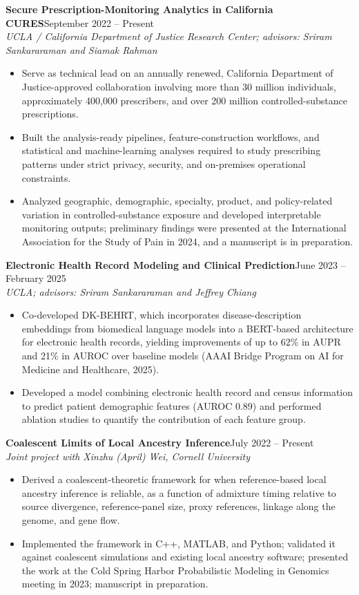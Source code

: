 \documentclass[10pt,letterpaper]{article}
\newcommand{\entry}[4]{\noindent\textbf{#1}\hfill #2\\ {\itshape #3}\hfill #4\par}
\begin{document}
\entry{Secure Prescription-Monitoring Analytics in California CURES}{September 2022 -- Present}{UCLA / California Department of Justice Research Center; advisors: Sriram Sankararaman and Siamak Rahman}{}
\begin{itemize}
\item Serve as technical lead on an annually renewed, California Department of Justice-approved collaboration involving more than 30 million individuals, approximately 400,000 prescribers, and over 200 million controlled-substance prescriptions.
\item Built the analysis-ready pipelines, feature-construction workflows, and statistical and machine-learning analyses required to study prescribing patterns under strict privacy, security, and on-premises operational constraints.
\item Analyzed geographic, demographic, specialty, product, and policy-related variation in controlled-substance exposure and developed interpretable monitoring outputs; preliminary findings were presented at the International Association for the Study of Pain in 2024, and a manuscript is in preparation.
\end{itemize}

\entry{Electronic Health Record Modeling and Clinical Prediction}{June 2023 -- February 2025}{UCLA; advisors: Sriram Sankararaman and Jeffrey Chiang}{}
\begin{itemize}
\item Co-developed DK-BEHRT, which incorporates disease-description embeddings from biomedical language models into a BERT-based architecture for electronic health records, yielding improvements of up to 62\% in AUPR and 21\% in AUROC over baseline models (AAAI Bridge Program on AI for Medicine and Healthcare, 2025).
\item Developed a model combining electronic health record and census information to predict patient demographic features (AUROC 0.89) and performed ablation studies to quantify the contribution of each feature group.
\end{itemize}

\entry{Coalescent Limits of Local Ancestry Inference}{July 2022 -- Present}{Joint project with Xinzhu (April) Wei, Cornell University}{}
\begin{itemize}
\item Derived a coalescent-theoretic framework for when reference-based local ancestry inference is reliable, as a function of admixture timing relative to source divergence, reference-panel size, proxy references, linkage along the genome, and gene flow.
\item Implemented the framework in C++, MATLAB, and Python; validated it against coalescent simulations and existing local ancestry software; presented the work at the Cold Spring Harbor Probabilistic Modeling in Genomics meeting in 2023; manuscript in preparation.
\end{itemize}
\end{document}
